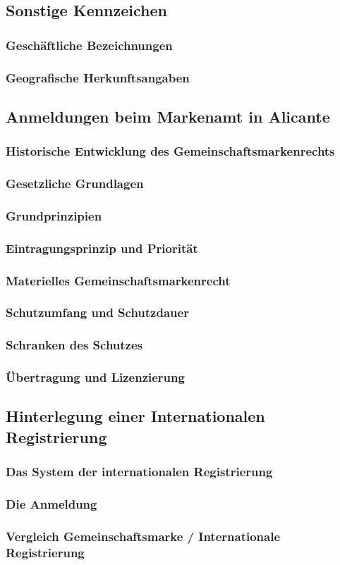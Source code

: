 \documentclass{report}
\begin{document}
\subsection{Sonstige Kennzeichen}
\subsubsection{Geschäftliche Bezeichnungen}
\subsubsection{Geografische Herkunftsangaben}
\subsection{Anmeldungen beim Markenamt in Alicante}
\subsubsection{Historische Entwicklung des Gemeinschaftsmarkenrechts}
\subsubsection{Gesetzliche Grundlagen}
\subsubsection{Grundprinzipien}
\subsubsection{Eintragungsprinzip und Priorität}
\subsubsection{Materielles Gemeinschaftsmarkenrecht}
\subsubsection{Schutzumfang und Schutzdauer}
\subsubsection{Schranken des Schutzes}
\subsubsection{Übertragung und Lizenzierung}
\subsection{Hinterlegung einer Internationalen Registrierung}
\subsubsection{Das System der internationalen Registrierung}
\subsubsection{Die Anmeldung}
\subsubsection{Vergleich Gemeinschaftsmarke / Internationale Registrierung}
\end{document}
